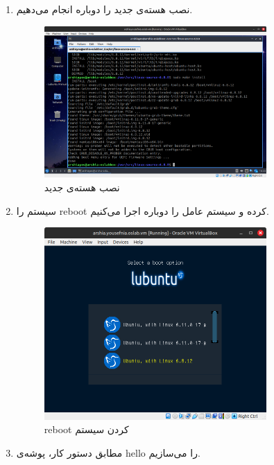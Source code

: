 \documentclass[12pt]{article}
\begin{document}
\begin{enumerate}
        \item 
        نصب هسته‌ی جدید را دوباره انجام می‌دهیم.

        \begin{figure}[H]
		\centering
		\includegraphics[width=0.8\textwidth]{report2-resources/18.png}
		\caption{نصب هسته‌ی جدید}
	\end{figure}

        \item 
        سیستم را 
        \textenglish{reboot}
        کرده و سیستم عامل را دوباره اجرا می‌کنیم.

        \begin{figure}[H]
		\centering
		\includegraphics[width=0.8\textwidth]{report2-resources/20.png}
		\caption{\textenglish{reboot} کردن سیستم}
	\end{figure}

        \item 
        مطابق دستور کار، پوشه‌ی 
        \textenglish{hello}
        را می‌سازیم.


\end{enumerate}
\end{document}
